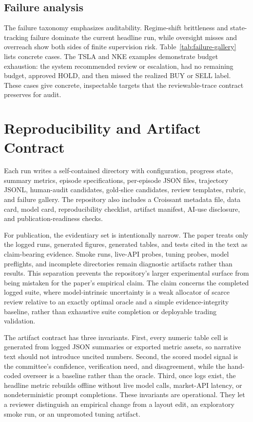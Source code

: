 \documentclass[10pt,twocolumn]{article}
\begin{document}
\subsection{Failure analysis}




The failure taxonomy emphasizes auditability. Regime-shift brittleness and state-tracking failure dominate the current headline run, while oversight misses and overreach show both sides of finite supervision risk. Table~\ref{tab:failure-gallery} lists concrete cases. The TSLA and NKE examples demonstrate budget exhaustion: the system recommended review or escalation, had no remaining budget, approved HOLD, and then missed the realized BUY or SELL label. These cases give concrete, inspectable targets that the reviewable-trace contract preserves for audit.

\FloatBarrier

\section{Reproducibility and Artifact Contract}

Each run writes a self-contained directory with configuration, progress state, summary metrics, episode specifications, per-episode JSON files, trajectory JSONL, human-audit candidates, gold-slice candidates, review templates, rubric, and failure gallery. The repository also includes a Croissant metadata file, data card, model card, reproducibility checklist, artifact manifest, AI-use disclosure, and publication-readiness checks.

For publication, the evidentiary set is intentionally narrow. The paper treats only the logged runs, generated figures, generated tables, and tests cited in the text as claim-bearing evidence. Smoke runs, live-API probes, tuning probes, model preflights, and incomplete directories remain diagnostic artifacts rather than results. This separation prevents the repository's larger experimental surface from being mistaken for the paper's empirical claim. The claim concerns the completed logged suite, where model-intrinsic uncertainty is a weak allocator of scarce review relative to an exactly optimal oracle and a simple evidence-integrity baseline, rather than exhaustive suite completion or deployable trading validation.

The artifact contract has three invariants. First, every numeric table cell is generated from logged JSON summaries or exported metric assets, so narrative text should not introduce uncited numbers. Second, the scored model signal is the committee's confidence, verification need, and disagreement, while the hand-coded overseer is a baseline rather than the oracle. Third, once logs exist, the headline metric rebuilds offline without live model calls, market-API latency, or nondeterministic prompt completions. These invariants are operational. They let a reviewer distinguish an empirical change from a layout edit, an exploratory smoke run, or an unpromoted tuning artifact.
\end{document}
